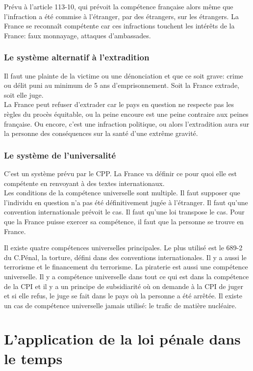 \documentclass[10pt, a4paper, openany]{book}
\begin{document}
Prévu à l'article 113-10, qui prévoit la compétence française alors même que l'infraction a été commise à l'étranger, par des étrangers, sur les étrangers. La France se reconnaît compétente car ces infractions touchent les intérêts de la France: faux monnayage, attaques d'ambassades. 

\subsubsection{Le système alternatif à l'extradition}

Il faut une plainte de la victime ou une dénonciation et que ce soit grave: crime ou délit puni au minimum de 5 ans d'emprisonnement. Soit la France extrade, soit elle juge. \\
La France peut refuser d'extrader car le pays en question ne respecte pas les règles du procès équitable, ou la peine encoure est une peine contraire aux peines française. Ou encore, c'est une infraction politique, ou alors l'extradition aura sur la personne des conséquences sur la santé d'une extrême gravité. 

\subsubsection{Le système de l'universalité}

C'est un système prévu par le CPP. La France va définir ce pour quoi elle est compétente en renvoyant à des textes internationaux. \\
Les conditions de la compétence universelle sont multiple. Il faut supposer que l'individu en question n'a pas été définitivement jugée à l'étranger. Il faut qu'une convention internationale prévoit le cas. Il faut qu'une loi transpose le cas. Pour que la France puisse exercer sa compétence, il faut que la personne se trouve en France. 


Il existe quatre compétences universelles principales. Le plus utilisé est le 689-2 du C.Pénal, la torture, défini dans des conventions internationales. Il y a aussi le terrorisme et le financement du terrorisme. La piraterie est aussi une compétence universelle. Il y a compétence universelle dans tout ce qui est dans la compétence de la CPI et il y a un principe de subsidiarité où on demande à la CPI de juger et si elle refus, le juge se fait dans le pays où la personne a été arrêtée. Il existe un cas de compétence universelle jamais utilisé: le trafic de matière nucléaire. 

\section{L'application de la loi pénale dans le temps}
\end{document}
